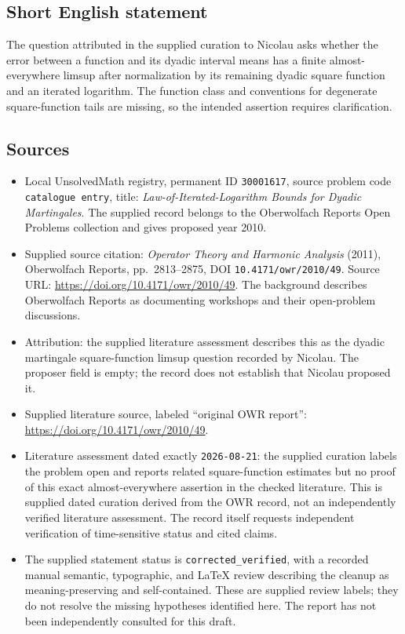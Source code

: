 \documentclass[11pt]{article}
\begin{document}
\subsection{Short English statement}
The question attributed in the supplied curation to Nicolau asks whether the error between a function and its dyadic interval means has a finite almost-everywhere limsup after normalization by its remaining dyadic square function and an iterated logarithm. The function class and conventions for degenerate square-function tails are missing, so the intended assertion requires clarification.
\subsection{Sources}
\begin{itemize}
\item Local UnsolvedMath registry, permanent ID \texttt{30001617}, source problem code \texttt{catalogue entry}, title: \emph{Law-of-Iterated-Logarithm Bounds for Dyadic Martingales}. The supplied record belongs to the Oberwolfach Reports Open Problems collection and gives proposed year 2010.
\item Supplied source citation: \emph{Operator Theory and Harmonic Analysis} (2011), Oberwolfach Reports, pp.\ 2813--2875, DOI \texttt{10.4171/owr/2010/49}. Source URL: \url{https://doi.org/10.4171/owr/2010/49}. The background describes Oberwolfach Reports as documenting workshops and their open-problem discussions.
\item Attribution: the supplied literature assessment describes this as the dyadic martingale square-function limsup question recorded by Nicolau. The proposer field is empty; the record does not establish that Nicolau proposed it.
\item Supplied literature source, labeled ``original OWR report'': \url{https://doi.org/10.4171/owr/2010/49}.
\item Literature assessment dated exactly \texttt{2026-08-21}: the supplied curation labels the problem open and reports related square-function estimates but no proof of this exact almost-everywhere assertion in the checked literature. This is supplied dated curation derived from the OWR record, not an independently verified literature assessment. The record itself requests independent verification of time-sensitive status and cited claims.
\item The supplied statement status is \texttt{corrected\_verified}, with a recorded manual semantic, typographic, and LaTeX review describing the cleanup as meaning-preserving and self-contained. These are supplied review labels; they do not resolve the missing hypotheses identified here. The report has not been independently consulted for this draft.
\end{itemize}
\end{document}
